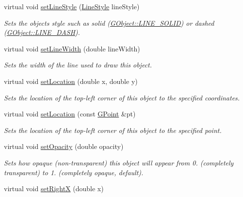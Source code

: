 \begin{DoxyCompactItemize}
virtual void \mbox{\hyperlink{classGObject_add11575087eb94f1a71faa3f826c6341}{set\+Line\+Style}} (\mbox{\hyperlink{classGObject_a86e0f5648542856159bb40775c854aa7}{Line\+Style}} line\+Style)
\begin{DoxyCompactList}\small\item\em Sets the object\textquotesingle{}s style such as solid (\mbox{\hyperlink{classGObject_a86e0f5648542856159bb40775c854aa7a700c78bc2cd76acaab26651bf7b4941f}{G\+Object\+::\+L\+I\+N\+E\+\_\+\+S\+O\+L\+ID}}) or dashed (\mbox{\hyperlink{classGObject_a86e0f5648542856159bb40775c854aa7a9ccba0845f785d81d07b333ae1aad84e}{G\+Object\+::\+L\+I\+N\+E\+\_\+\+D\+A\+SH}}). \end{DoxyCompactList}\item 
virtual void \mbox{\hyperlink{classGObject_afd6a47c6ea6a1f85ca05a65ba3ff3477}{set\+Line\+Width}} (double line\+Width)
\begin{DoxyCompactList}\small\item\em Sets the width of the line used to draw this object. \end{DoxyCompactList}\item 
virtual void \mbox{\hyperlink{classGObject_a04594e8ba9b98513a64f1da00dcae18c}{set\+Location}} (double x, double y)
\begin{DoxyCompactList}\small\item\em Sets the location of the top-\/left corner of this object to the specified coordinates. \end{DoxyCompactList}\item 
virtual void \mbox{\hyperlink{classGObject_aa8480c0b7166cdf8f784cece06ab353f}{set\+Location}} (const \mbox{\hyperlink{classGPoint}{G\+Point}} \&pt)
\begin{DoxyCompactList}\small\item\em Sets the location of the top-\/left corner of this object to the specified point. \end{DoxyCompactList}\item 
virtual void \mbox{\hyperlink{classGObject_a04af1866cc1bae4a1226695794a50539}{set\+Opacity}} (double opacity)
\begin{DoxyCompactList}\small\item\em Sets how opaque (non-\/transparent) this object will appear from 0. (completely transparent) to 1. (completely opaque, default). \end{DoxyCompactList}\item 
virtual void \mbox{\hyperlink{classGObject_a3c90b758cdc2c911c9ef76c4360eb912}{set\+RightX}} (double x)

\end{DoxyCompactItemize}
